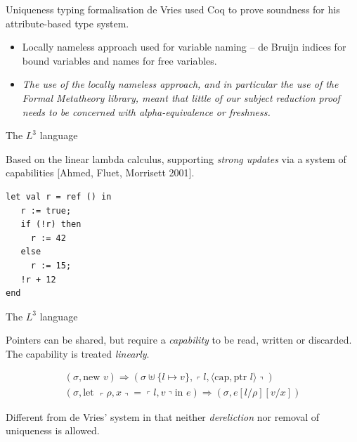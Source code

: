 \documentclass[10pt]{beamer}
\newcommand{\lquine}{\left\ulcorner}
\newcommand{\rquine}{\right\urcorner}
\newcommand{\capa}{\text{cap}}
\newcommand{\ptr}{\text{ptr }}
\begin{document}
\begin{frame}{Uniqueness typing formalisation}
de Vries used Coq to prove soundness for his attribute-based type system.

\begin{itemize}
\item Locally nameless approach used for variable naming -- de Bruijn indices for bound variables and names for free variables.

\item \textit{The use of the locally nameless approach, and in particular the use of the Formal Metatheory library, meant that little of our subject reduction
proof needs to be concerned with alpha-equivalence or freshness.}

\end{itemize}
\end{frame}

\begin{frame}[fragile]{The \textbf{$L^3$} language}

Based on the linear lambda calculus, supporting \textit{strong updates} via a system of capabilities [Ahmed, Fluet, Morrisett 2001].

\begin{verbatim}
let val r = ref () in
   r := true;
   if (!r) then
     r := 42
   else
     r := 15;
   !r + 12
end
\end{verbatim}

\end{frame}

\begin{frame}{The \textbf{$L^3$} language}

Pointers can be shared, but require a \textit{capability} to be read, written or discarded. The capability is treated \textit{linearly}.

\begin{eqnarray*}
(\sigma, \text{new } v) \Rightarrow (\sigma \uplus \{l \mapsto v\},
	\lquine l, \langle \capa, \ptr l \rangle \rquine)
\\
(\sigma, \text{let } \lquine \rho, x \rquine = \lquine l, v \rquine \text{in } e)
	\Rightarrow
	(\sigma, e[l/\rho][v/x])
\end{eqnarray*}

Different from de Vries' system in that neither \textit{dereliction} nor removal of uniqueness is allowed.

\end{frame}
\end{document}
